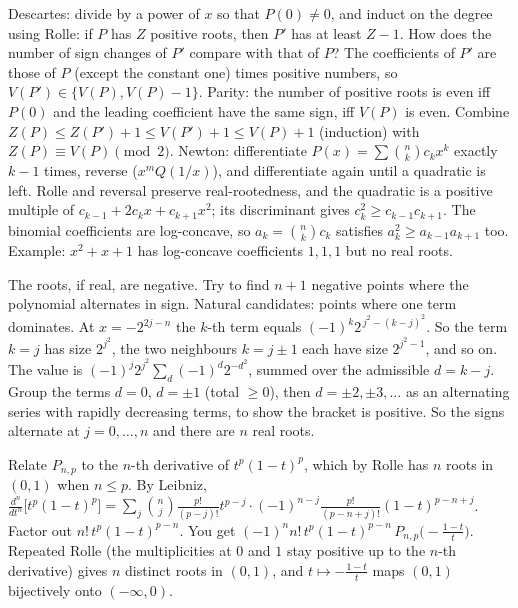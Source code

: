 \documentclass[11pt,a4paper]{article}
\begin{document}

 Descartes: divide by a power of $x$ so that $P(0)\ne0$, and induct on the degree using Rolle: if $P$ has $Z$ positive roots, then $P'$ has at least $Z-1$. How does the number of sign changes of $P'$ compare with that of $P$?
 The coefficients of $P'$ are those of $P$ (except the constant one) times positive numbers, so $V(P')\in\{V(P),V(P)-1\}$. Parity: the number of positive roots is even iff $P(0)$ and the leading coefficient have the same sign, iff $V(P)$ is even. Combine $Z(P)\le Z(P')+1\le V(P')+1\le V(P)+1$ (induction) with $Z(P)\equiv V(P)\pmod 2$.
 Newton: differentiate $P(x)=\sum\binom nkc_kx^k$ exactly $k-1$ times, reverse ($x^mQ(1/x)$), and differentiate again until a quadratic is left. Rolle and reversal preserve real-rootedness, and the quadratic is a positive multiple of $c_{k-1}+2c_kx+c_{k+1}x^2$; its discriminant gives $c_k^2\ge c_{k-1}c_{k+1}$.
 The binomial coefficients are log-concave, so $a_k=\binom nkc_k$ satisfies $a_k^2\ge a_{k-1}a_{k+1}$ too. Example: $x^2+x+1$ has log-concave coefficients $1,1,1$ but no real roots.

 The roots, if real, are negative. Try to find $n+1$ negative points where the polynomial alternates in sign. Natural candidates: points where one term dominates.
 At $x=-2^{2j-n}$ the $k$-th term equals $(-1)^k2^{\,j^2-(k-j)^2}$. So the term $k=j$ has size $2^{j^2}$, the two neighbours $k=j\pm1$ each have size $2^{j^2-1}$, and so on.
 The value is $(-1)^j2^{j^2}\sum_{d}(-1)^d2^{-d^2}$, summed over the admissible $d=k-j$. Group the terms $d=0$, $d=\pm1$ (total $\ge0$), then $d=\pm2,\pm3,\dots$ as an alternating series with rapidly decreasing terms, to show the bracket is positive. So the signs alternate at $j=0,\dots,n$ and there are $n$ real roots.

 Relate $P_{n,p}$ to the $n$-th derivative of $t^p(1-t)^p$, which by Rolle has $n$ roots in $(0,1)$ when $n\le p$.
 By Leibniz, $\frac{d^n}{dt^n}\bigl[t^p(1-t)^p\bigr]=\sum_j\binom nj\frac{p!}{(p-j)!}t^{p-j}\cdot(-1)^{n-j}\frac{p!}{(p-n+j)!}(1-t)^{p-n+j}$. Factor out $n!\,t^{p}(1-t)^{p-n}$.
 You get $(-1)^nn!\,t^p(1-t)^{p-n}\,P_{n,p}\!\bigl(-\tfrac{1-t}{t}\bigr)$. Repeated Rolle (the multiplicities at $0$ and $1$ stay positive up to the $n$-th derivative) gives $n$ distinct roots in $(0,1)$, and $t\mapsto-\frac{1-t}t$ maps $(0,1)$ bijectively onto $(-\infty,0)$.
\end{document}
